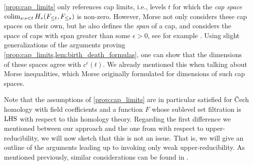 \begin{rem}
	\cref{prop:cap_limits} only references cap limits, i.e., levels $t$ for which the \emph{cap space} $\operatorname*{colim}_{s: s < t} H_*(F_{\leq t}, F_{\leq s})$ is non-zero.
	However, Morse not only considers these cap spaces on their own, but he also defines the \emph{span} of a cap, and considers the space of caps with span greater than some $\epsilon > 0$, see for example \cite[Section 11]{Morse.1940}.
	Using slight generalizations of the arguments proving \cref{prop:cap_limits,lem:birth_death_formulas}, one can show that the dimensions of these spaces agree with $c^{\epsilon}(t)$.
	We already mentioned this when talking about Morse inequalities, which Morse originally formulated for dimensions of such cap spaces.
\end{rem}

Note that the assumptions of \cref{prop:cap_limits} are in particular satisfied for \v{C}ech homology with field coefficients and a function $F$ whose sublevel set filtration is $\mathrm{LHS}$ with respect to this homology theory.
Regarding the first difference we mentioned between our approach and the one from \cite[Theorem 8.1]{Morse.1938} with respect to upper-reducibility, we will now sketch that this is not an issue.
That is, we will give an outline of the arguments leading up to \cite[Theorem 8.1]{Morse.1938} invoking only weak upper-reducibility.
As mentioned previously, similar considerations can be found in \cite[Remark II.6.3]{Struwe.1988}.
